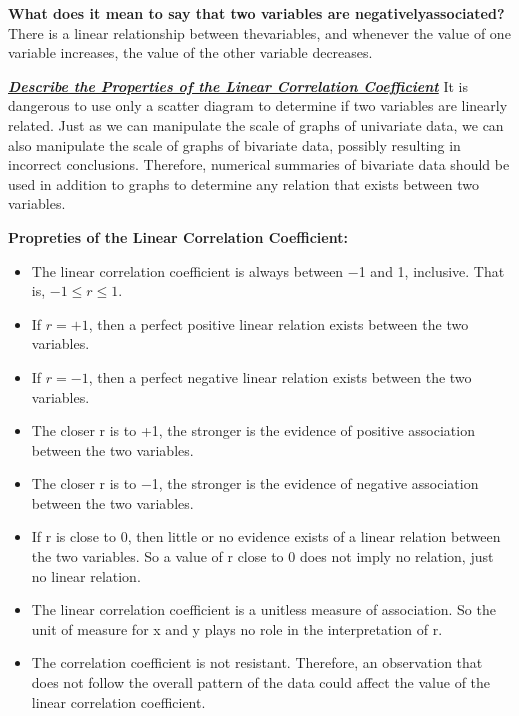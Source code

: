 \documentclass{report}
\begin{document}
    \bigbreak \noindent 
    \textbf{What does it mean to say that two variables are negatively​ associated?}
    \bigbreak \noindent 
    There is a linear relationship between the​ variables, and whenever the value of one variable​ increases, the value of the other variable decreases.

    \bigbreak \noindent \bigbreak \noindent 
    \textbf{\textit{\underline{Describe the Properties of the Linear Correlation Coefficient}}}
    \bigbreak \noindent 
    It is dangerous to use only a scatter diagram to determine if two variables are linearly related. 
    \bigbreak \noindent 
     Just as we can manipulate the scale of graphs of univariate data, we can also manipulate the scale of graphs of bivariate data, possibly resulting in incorrect conclusions. Therefore, numerical summaries of bivariate data should be used in addition to graphs to determine any relation that exists between two variables.

     \bigbreak \noindent 
     \textbf{Propreties of the Linear Correlation Coefficient:}
     \bigbreak \noindent 
     \begin{itemize}
         \item The linear correlation coefficient is always between −1 and 1, inclusive. That is, $-1 \leq r \leq 1$.
         \item If $r=+1$, then a perfect positive linear relation exists between the two variables.
         \item If $r=−1$, then a perfect negative linear relation exists between the two variables.
         \item The closer r is to +1, the stronger is the evidence of positive association between the two variables. 
         \item The closer r is to −1, the stronger is the evidence of negative association between the two variables.
         \item If r is close to 0, then little or no evidence exists of a linear relation between the two variables. So a value of r close to 0 does not imply no relation, just no linear relation. 
         \item The linear correlation coefficient is a unitless measure of association. So the unit of measure for x and y plays no role in the interpretation of r.
         \item The correlation coefficient is not resistant. Therefore, an observation that does not follow the overall pattern of the data could affect the value of the linear correlation coefficient.
     \end{itemize}
\end{document}
